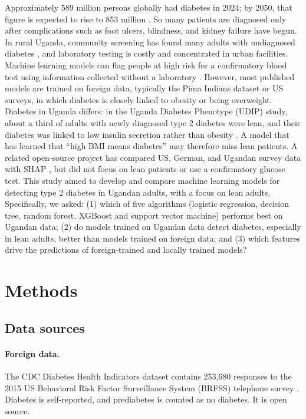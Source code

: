 \documentclass[11pt]{article}
\begin{document}
Approximately 589 million persons globally had diabetes in 2024; by 2050, that figure is expected to rise to 853 million \citep{genitsaridi2026}. So many patients are diagnosed only after complications such as foot ulcers, blindness, and kidney failure have begun. In rural Uganda, community screening has found many adults with undiagnosed diabetes \citep{10.1093/inthealth/ihaf050}, and laboratory testing is costly and concentrated in urban facilities.
Machine learning models can flag people at high risk for a confirmatory blood test using information collected without a laboratory \citep{xie2019building}. However, most published models are trained on foreign data, typically the Pima Indians dataset \citep{smith1988pima} or US surveys, in which diabetes is closely linked to obesity or being overweight. Diabetes in Uganda differs: in the Uganda Diabetes Phenotype (UDIP) study, about a third of adults with newly diagnosed type 2 diabetes were lean, and their diabetes was linked to low insulin secretion rather than obesity \citep{kibirige2022understanding, kibirige2022apparent}. A model that has learned that ``high BMI means diabetes'' may therefore miss lean patients. A related open-source project has compared US, German, and Ugandan survey data with SHAP \citep{andanter_repo}, but did not focus on lean patients or use a confirmatory glucose test.
This study aimed to develop and compare machine learning models for detecting type 2 diabetes in Ugandan adults, with a focus on lean adults. Specifically, we asked: (1) which of five algorithms (logistic regression, decision tree, random forest, XGBoost and support vector machine) performs best on Ugandan data; (2) do models trained on Ugandan data detect diabetes, especially in lean adults, better than models trained on foreign data; and (3) which features drive the predictions of foreign-trained and locally trained models?


\section{Methods}

\subsection{Data sources}

\paragraph{Foreign data.} The CDC Diabetes Health Indicators dataset contains 253,680 responses to the 2015 US Behavioral Risk Factor Surveillance System (BRFSS) telephone survey \citep{cdc2017dataset}. Diabetes is self-reported, and prediabetes is counted as no diabetes. It is open source.
\end{document}
